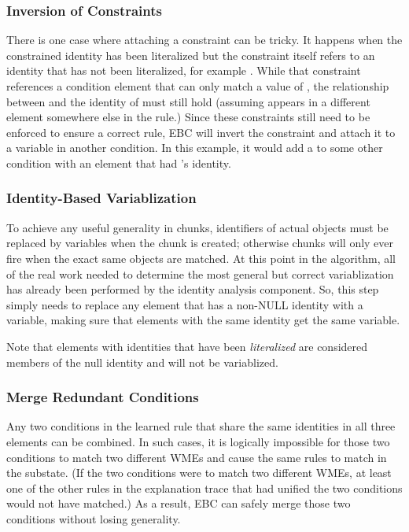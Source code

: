 \subsubsection*{Inversion of Constraints}

There is one case where attaching a constraint can be tricky.  It happens when the constrained identity has been literalized but the constraint itself refers to an identity that has not been literalized, for example .  While that constraint references a condition element that can only match a value of , the relationship between  and the identity of  must still hold (assuming  appears in a different element somewhere else in the rule.)  Since these constraints still need to be enforced to ensure a correct rule, EBC will invert the constraint and attach it to a variable in another condition.  In this example, it would add a  to some other condition with an element that had 's identity.

\subsubsection{Identity-Based Variablization}

To achieve any useful generality in chunks, identifiers of actual objects must be replaced by variables when the chunk is created; otherwise chunks will only ever fire when the exact same objects are matched.  At this point in the algorithm, all of the real work needed to determine the most general but correct variablization has already been performed by the identity analysis component.  So, this step simply needs to replace any element that has a non-NULL identity with a variable, making sure that elements with the same identity get the same variable.

Note that elements with identities that have been \textit{literalized} are considered members of the null identity and will not be variablized.

\subsubsection{Merge Redundant Conditions}

Any two conditions in the learned rule that share the same identities in all three elements can be combined.  In such cases, it is logically impossible for those two conditions to match two different WMEs and cause the same rules to match in the substate.  (If the two conditions were to match two different WMEs, at least one of the other rules in the explanation trace that had unified the two conditions would not have matched.)  As a result, EBC can safely merge those two conditions without losing generality.  

